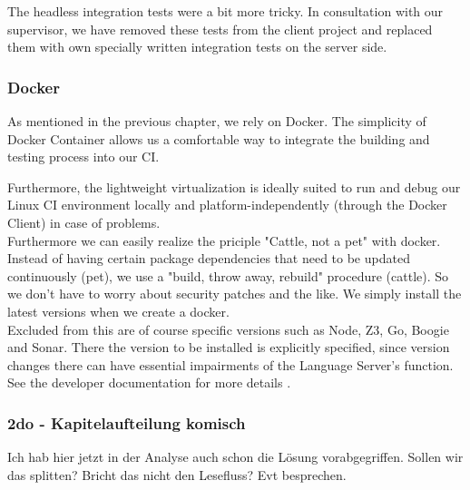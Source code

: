 The headless integration tests were a bit more tricky.
In consultation with our supervisor, we have removed these tests from the client project and replaced them with own specially written integration tests on the server side.

\subsubsection{Docker}
As mentioned in the previous chapter, we rely on Docker.
The simplicity of Docker Container allows us a comfortable way to integrate the building and testing process into our CI.

Furthermore, the lightweight virtualization is ideally suited to run and debug our Linux CI environment
locally and platform-independently (through the Docker Client) in case of problems. \\

Furthermore we can easily realize the priciple "Cattle, not a pet" with docker.
Instead of having certain package dependencies that need to be updated continuously (pet), we use a "build, throw away, rebuild" procedure (cattle). So we don't have to worry about security patches and the like. We simply install the latest versions when we create a docker. \\

Excluded from this are of course specific versions such as Node, Z3, Go, Boogie and Sonar.
There the version to be installed is explicitly specified, since version changes there
can have essential impairments of the Language Server's function. See the developer documentation for more details \cite{dev}. \\

\subsubsection{2do - Kapitelaufteilung komisch}
Ich hab hier jetzt in der Analyse auch schon die Lösung vorabgegriffen. Sollen wir das splitten? Bricht das nicht den Lesefluss? Evt besprechen.
